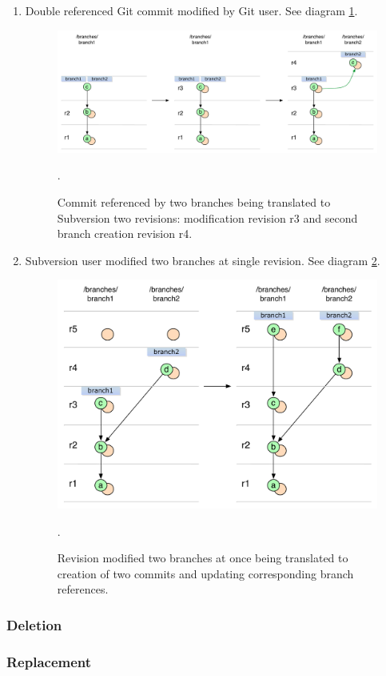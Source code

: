\begin{enumerate}

\item Double referenced Git commit modified by Git user. See diagram \ref{ambiguous_svn_branch_git_to_svn}.
\begin{figure}[!h]
\centering
\renewcommand{\figurename}{Diagram}
\includegraphics[width=\linewidth]{img/diagrams/ambiguous_svn_branch_git_to_svn.pdf}
\caption{Commit referenced by two branches being translated to Subversion two revisions: modification revision r3 and second branch creation revision r4.}
\label{ambiguous_svn_branch_git_to_svn}.
\end{figure}

\item Subversion user modified two branches at single revision. See diagram \ref{double_branch_change_svn_to_git}.
\begin{figure}[!h]
\centering
\renewcommand{\figurename}{Diagram}
\includegraphics[width=\linewidth]{img/diagrams/double_branch_change_svn_to_git.pdf}
\caption{Revision modified two branches at once being translated to creation of two commits and updating corresponding branch references.}
\label{double_branch_change_svn_to_git}.
\end{figure}
\end{enumerate}

\subsubsection{Deletion}

\subsubsection{Replacement}
